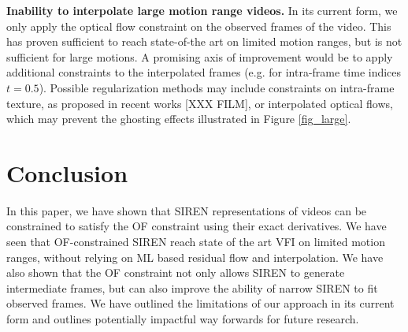 \documentclass{article}
\begin{document}
\textbf{Inability to interpolate large motion range videos.}
In its current form, we only apply the optical flow constraint on the observed frames of the video.
This has proven sufficient to reach state-of-the art on limited motion ranges, but is not sufficient for large motions.
A promising axis of improvement would be to apply additional constraints to the interpolated frames
(e.g. for intra-frame time indices $t=0.5$).
Possible regularization methods may include constraints on intra-frame texture, as proposed in recent works [XXX FILM],
or interpolated optical flows, which may prevent the ghosting effects illustrated in Figure \ref{fig_large}.

\section{Conclusion}
\label{sec_conc}

In this paper, we have shown that SIREN representations of videos
can be constrained to satisfy the OF constraint using their exact derivatives.
We have seen that OF-constrained SIREN reach state of the art VFI on limited motion ranges,
without relying on ML based residual flow and interpolation.
We have also shown that the OF constraint not only allows SIREN to generate intermediate frames,
but can also improve the ability of narrow SIREN to fit observed frames.
We have outlined the limitations of our approach in its current form and outlines
potentially impactful way forwards for future research.



\end{document}
